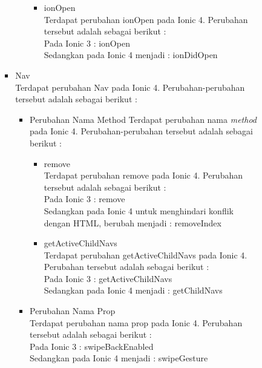 \begin{enumerate}
\begin{enumerate}
\begin{itemize}
\begin{itemize}
\begin{itemize}
\begin{itemize}
							\item ionOpen \\
							Terdapat perubahan ionOpen pada Ionic 4. Perubahan tersebut adalah sebagai berikut : \\
							Pada Ionic 3 : ionOpen \\
							Sedangkan pada Ionic 4 menjadi : ionDidOpen
						\end{itemize}	
				\end{itemize}
				\newpage
				\item Nav \\
				Terdapat perubahan Nav pada Ionic 4. Perubahan-perubahan tersebut adalah sebagai berikut :
				\begin{itemize}
					\item Perubahan Nama Method 
					Terdapat perubahan nama {\it method} pada Ionic 4. Perubahan-perubahan tersebut adalah sebagai berikut :
					\begin{itemize}
						\item remove \\
						Terdapat perubahan remove pada Ionic 4. Perubahan tersebut adalah sebagai berikut :\\
						Pada Ionic 3 : remove \\
						Sedangkan pada Ionic 4 untuk menghindari konflik dengan HTML, berubah menjadi : removeIndex 

						\item getActiveChildNavs \\
						Terdapat perubahan getActiveChildNavs pada Ionic 4. Perubahan tersebut adalah sebagai berikut :\\
						Pada Ionic 3 : getActiveChildNavs \\
						Sedangkan pada Ionic 4 menjadi : getChildNavs
					\end{itemize}

					\item Perubahan Nama Prop \\
					Terdapat perubahan nama prop pada Ionic 4. Perubahan tersebut adalah sebagai berikut :\\
					Pada Ionic 3 : swipeBackEnabled   \\
					Sedangkan pada Ionic 4 menjadi : swipeGesture
				\end{itemize}	


\end{itemize}
\end{itemize}
\end{enumerate}
\end{enumerate}
